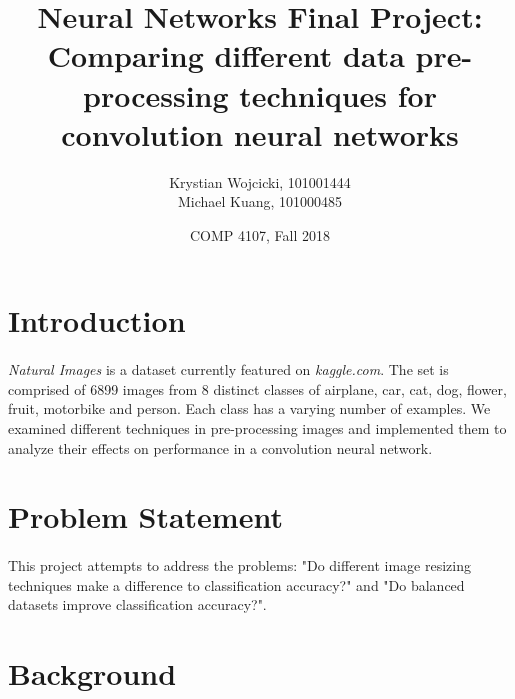 \documentclass{article}
\title{Neural Networks Final Project: \\
	\large{Comparing different data pre-processing techniques for convolution neural networks}}
\author{Krystian Wojcicki, 101001444 \\ Michael Kuang, 101000485}
\date{COMP 4107, Fall 2018}
\begin{document}
\maketitle

\newcommand{\figureWidth}{0.25}
\section{Introduction}
\paragraph{}
{\em Natural Images} is a dataset currently featured on {\em kaggle.com}. The set is comprised of 6899 images from 8 distinct classes of airplane, car, cat, dog, flower, fruit, motorbike and person. Each class has a varying number of examples. We examined different techniques in pre-processing images and implemented them to analyze their effects on performance in a convolution neural network. 

\section{Problem Statement}
\paragraph{}
This project attempts to address the problems: "Do different image resizing techniques make a difference to classification accuracy?" and "Do balanced datasets improve classification accuracy?".

\section{Background}
\end{document}
